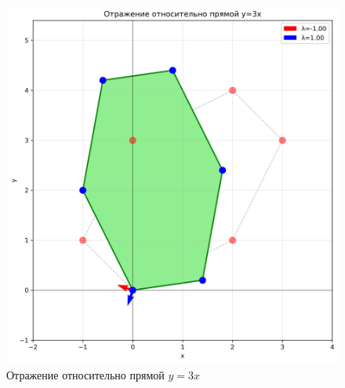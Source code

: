 \begin{figure}[h]
\centering
\begin{minipage}{0.31\textwidth}
\centering
\includegraphics[width=\textwidth]{images/task1/reflection_y_ax.png}
\caption{Отражение относительно прямой $y = 3x$}
\label{fig:reflection_y_ax}
\end{minipage}
\hfill
\begin{minipage}{0.31\textwidth}
\centering

\end{minipage}
\end{figure}
